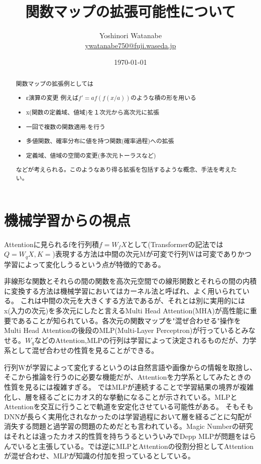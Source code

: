 \documentclass[a4paper,11pt]{article}
\begin{document}
\title{関数マップの拡張可能性について}
\author{Yoshinori Watanabe \\ \href{mailto::ywatanabe750@fuji.waseda.jp}{ywatanabe750@fuji.waseda.jp}}
\date{\today}
\maketitle

\begin{abstract}
関数マップの拡張例としては
\begin{itemize}
    \item ε演算の変更 例えば$f'=af(f(x/a))$のような積の形を用いる
    \item x(関数の定義域、値域)を１次元から高次元に拡張
    \item 一回で複数の関数適用$\cdot$を行う
    \item 多値関数、確率分布に値を持つ関数(確率過程)への拡張
    \item 定義域、値域の空間の変更(多次元トーラスなど)
\end{itemize}
などが考えられる。このようなあり得る拡張を包括するような概念、手法を考えたい。
\end{abstract} 
    
\section{機械学習からの視点}
Attentionに見られるfを行列積$f=W_f X$として(Transformerの記法では$Q=W_qX, K=$)表現する方法は中間の次元Mが可変で行列Wは可変でありかつ学習によって変化しうるという点が特徴的である。

非線形な関数とそれらの間の関数を高次元空間での線形関数とそれらの間の内積に変換する方法は機械学習においてはカーネル法と呼ばれ、よく用いられている。
これは中間の次元を大きくする方法であるが、それとは別に実用的にはx(入力の次元)を多次元にしたと言えるMulti Head Attention(MHA)が高性能に重要であることが知られている。各次元の関数マップを"混ぜ合わせる"操作をMulti Head Attentionの後段のMLP(Multi-Layer Perceptron)が行っているとみなせる。$W_q$などのAttention,MLPの行列は学習によって決定されるものだが、力学系として混ぜ合わせの性質を見ることができる。

行列Wが学習によって変化するというのは自然言語や画像からの情報を取捨し、そこから推論を行うのに必要な機能だが、Attentionを力学系としてみたときの性質を見るには複雑すぎる。
\cite{PhysRevLett.94.058102} ではMLPが連続することで学習結果の境界が複雑化し、層を経るごとにカオス的な挙動になることが示されている。MLPとAttentionを交互に行うことで軌道を安定化させている可能性がある。
そもそもDNNが長らく実用化されなかったのは学習過程において層を経るごとに勾配が消失する問題と過学習の問題のためだとも言われている。Magic Numberの研究はそれとは違ったカオス的性質を持ちうるといういみでDepp MLPが問題をはらんでいると主張している。\cite{kobayashi2024analyzing}では逆にMLPとAttentionの役割分担としてAttentionが混ぜ合わせ、MLPが知識の付加を担っているとしている。
\end{document}
